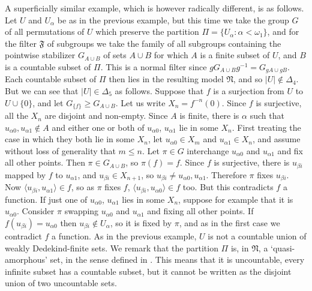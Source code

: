 \documentclass[a4paper,reqno]{amsart}
\numberwithin{equation}{section}
\begin{document}
A superficially similar example, which is however radically different, is as follows. Let $U$ and $U_\alpha$ be 
as in the previous example, but this time we take the group $G$ of all permutations of $U$ which preserve the
partition $\Pi = \{U_\alpha: \alpha < \omega_1\}$, and for the filter $\mathfrak F$ of subgroups we take the
family of all subgroups containing the pointwise stabilizer $G_{A \cup B}$ of sets $A \cup B$ for which $A$ is a
finite subset of $U$, and $B$ is a countable subset of $\Pi$. This is a normal filter since 
$gG_{A \cup B}g^{-1} = G_{gA \cup gB}$. Each countable subset of $\Pi$ then lies in the resulting model
$\mathfrak N$, and so $|U| \not \in \Delta_4$. But we can see that $|U| \in \Delta_5$ as follows. Suppose
that $f$ is a surjection from $U$ to $U \cup \{0\}$, and let $G_{\{f\}} \ge G_{A \cup B}$. Let us write $X_n = f^{-n}(0)$.
Since $f$ is surjective, all the $X_n$ are disjoint and non-empty. Since $A$ is finite, there is $\alpha$ such that
$u_{\alpha 0}, u_{\alpha 1} \not \in A$ and either one or both of $u_{\alpha 0}$, $u_{\alpha 1}$ lie in some $X_n$. First
treating the case in which they both lie in some $X_n$, let $u_{\alpha 0} \in X_m$ and $u_{\alpha 1} \in X_n$, and 
assume without loss of generality that $m \le n$. Let $\pi \in G$ interchange $u_{\alpha 0}$ and $u_{\alpha 1}$ and 
fix all other points. Then $\pi \in G_{A \cup B}$, so $\pi(f) = f$. Since $f$ is surjective, there is 
$u_{\beta i}$ mapped by $f$ to $u_{\alpha 1}$, and $u_{\beta i} \in X_{n+1}$, so 
$u_{\beta i} \neq u_{\alpha 0}, u_{\alpha 1}$. Therefore $\pi$ fixes $u_{\beta i}$. Now 
$\langle u_{\beta i}, u_{\alpha 1} \rangle \in f$, so as $\pi$ fixes $f$, 
$\langle u_{\beta i}, u_{\alpha 0} \rangle \in f$ too. But this contradicts $f$ a function. If just one of 
$u_{\alpha 0}$, $u_{\alpha 1}$ lies in some $X_n$, suppose for example that it is $u_{\alpha 0}$. Consider
$\pi$ swapping $u_{\alpha 0}$ and $u_{\alpha 1}$ and fixing all other points. If 
$f(u_{\beta i}) = u_{\alpha 0}$ then $u_{\beta i} \not \in U_\alpha$, so it is fixed by $\pi$, and as in the first
case we contradict $f$ a function. As in the previous
example, $U$ is not a countable union of weakly Dedekind-finite sets. We remark that the partition $\Pi$ is, in
$\mathfrak N$, a `quasi-amorphous' set, in the sense defined in \cite{Creed}. This means that it is uncountable,
every infinite subset has a countable subset, but it cannot be written as the disjoint union of two uncountable sets.
\end{document}
